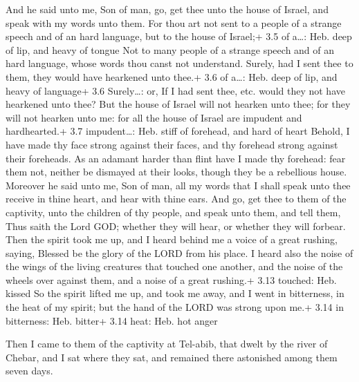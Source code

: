  And he said unto me, Son of man, go, get thee unto the
house of Israel, and speak with my words unto them.  For
thou art not sent to a people of a strange speech and of an hard
language, but to the house of Israel;+ 3.5 of a\ldots: Heb. deep of lip,
and heavy of tongue  Not to many people of a strange speech
and of an hard language, whose words thou canst not understand. Surely,
had I sent thee to them, they would have hearkened unto thee.+ 3.6 of
a\ldots: Heb. deep of lip, and heavy of language+ 3.6 Surely\ldots: or,
If I had sent thee, etc. would they not have hearkened unto thee?
 But the house of Israel will not hearken unto thee; for
they will not hearken unto me: for all the house of Israel are impudent
and hardhearted.+ 3.7 impudent\ldots: Heb. stiff of forehead, and hard
of heart  Behold, I have made thy face strong against their
faces, and thy forehead strong against their foreheads.  As
an adamant harder than flint have I made thy forehead: fear them not,
neither be dismayed at their looks, though they be a rebellious house.
 Moreover he said unto me, Son of man, all my words that I
shall speak unto thee receive in thine heart, and hear with thine ears.
 And go, get thee to them of the captivity, unto the
children of thy people, and speak unto them, and tell them, Thus saith
the Lord GOD; whether they will hear, or whether they will forbear.
 Then the spirit took me up, and I heard behind me a voice
of a great rushing, saying, Blessed be the glory of the LORD from his
place.  I heard also the noise of the wings of the living
creatures that touched one another, and the noise of the wheels over
against them, and a noise of a great rushing.+ 3.13 touched: Heb. kissed
 So the spirit lifted me up, and took me away, and I went
in bitterness, in the heat of my spirit; but the hand of the LORD was
strong upon me.+ 3.14 in bitterness: Heb. bitter+ 3.14 heat: Heb. hot
anger

 Then I came to them of the captivity at Tel-abib, that
dwelt by the river of Chebar, and I sat where they sat, and remained
there astonished among them seven days.

